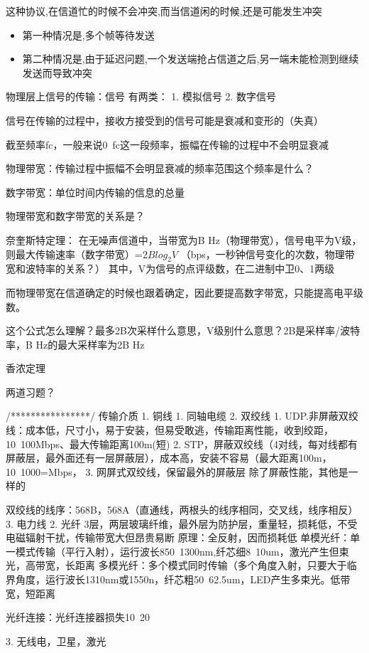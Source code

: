 \documentclass[UTF8,a4paper]{ctexart}
\begin{document}
这种协议,在信道忙的时候不会冲突,而当信道闲的时候,还是可能发生冲突
\begin{itemize}
  \item 第一种情况是,多个帧等待发送
  \item 第二种情况是,由于延迟问题,一个发送端抢占信道之后,另一端未能检测到继续发送而导致冲突
\end{itemize}
物理层上信号的传输：信号
有两类：
1. 模拟信号
2. 数字信号

信号在传输的过程中，接收方接受到的信号可能是衰减和变形的（失真）

截至频率fc，一般来说0~fc这一段频率，振幅在传输的过程中不会明显衰减

物理带宽：传输过程中振幅不会明显衰减的频率范围{这个频率是什么？}

数字带宽：单位时间内传输的信息的总量

物理带宽和数字带宽的关系是？

奈奎斯特定理：
在无噪声信道中，当带宽为B Hz（物理带宽），信号电平为V级，则最大传输速率（数字带宽）=$2Blog_2 V$ （bps，一秒钟信号变化的次数，物理带宽和波特率的关系？）
其中，V为信号的点评级数，在二进制中卫0、1两级

而物理带宽在信道确定的时候也跟着确定，因此要提高数字带宽，只能提高电平级数。

{这个公式怎么理解？最多2B次采样什么意思，V级别什么意思？2B是采样率/波特率，B Hz的最大采样率为2B Hz}

香浓定理

两道习题？

/****************/
传输介质
1. 铜线
	1. 同轴电缆
	2. 双绞线
		1. UDP.非屏蔽双绞线：成本低，尺寸小，易于安装，但易受敢逃，传输距离性能，收到绞距，10~100Mbps、最大传输距离100m(短)
		2. STP，屏蔽双绞线（4对线，每对线都有屏蔽层，最外面还有一层屏蔽层），成本高，安装不容易（最大距离100m，10~1000=Mbps，
		3. 网屏式双绞线，保留最外的屏蔽层
		除了屏蔽性能，其他是一样的

		双绞线的线序：568B，568A（直通线，两根头的线序相同，交叉线，线序相反）
	3. 电力线
2. 光纤
	3层，两层玻璃纤维，最外层为防护层，重量轻，损耗低，不受电磁辐射干扰，传输带宽大但昂贵易断
	原理：全反射，因而损耗低
	单模光纤：单一模式传输（平行入射），运行波长850~1300nm,纤芯细8~10um，激光产生但束光，高带宽，长距离
	多模光纤：多个模式同时传输（多个角度入射，只要大于临界角度，运行波长1310nm或1550n，纤芯粗50~62.5um，LED产生多束光。低带宽，短距离

	光纤连接：光纤连接器损失10~20%

3. 无线电，卫星，激光
\end{document}
